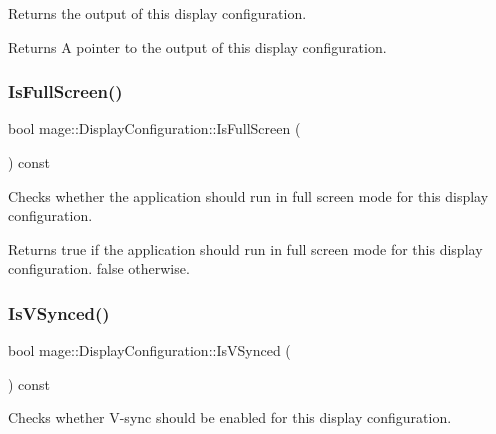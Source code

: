 Returns the output of this display configuration.

\begin{DoxyReturn}{Returns}
A pointer to the output of this display configuration. 
\end{DoxyReturn}
\hypertarget{structmage_1_1_display_configuration_ab984b32ff2b6ce6a376aa09399b9b45e}{}\label{structmage_1_1_display_configuration_ab984b32ff2b6ce6a376aa09399b9b45e} 
\subsubsection{\texorpdfstring{Is\+Full\+Screen()}{IsFullScreen()}}
{\footnotesize\ttfamily bool mage\+::\+Display\+Configuration\+::\+Is\+Full\+Screen (\begin{DoxyParamCaption}{ }\end{DoxyParamCaption}) const\hspace{0.3cm}{\ttfamily [noexcept]}}

Checks whether the application should run in full screen mode for this display configuration.

\begin{DoxyReturn}{Returns}
{\ttfamily true} if the application should run in full screen mode for this display configuration. {\ttfamily false} otherwise. 
\end{DoxyReturn}
\hypertarget{structmage_1_1_display_configuration_ab237c9b7953853eb83a51d542dfffb5e}{}\label{structmage_1_1_display_configuration_ab237c9b7953853eb83a51d542dfffb5e} 
\subsubsection{\texorpdfstring{Is\+V\+Synced()}{IsVSynced()}}
{\footnotesize\ttfamily bool mage\+::\+Display\+Configuration\+::\+Is\+V\+Synced (\begin{DoxyParamCaption}{ }\end{DoxyParamCaption}) const\hspace{0.3cm}{\ttfamily [noexcept]}}

Checks whether V-\/sync should be enabled for this display configuration.

